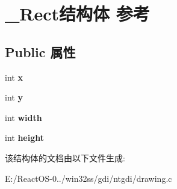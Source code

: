 \hypertarget{struct___rect}{}\section{\+\_\+\+Rect结构体 参考}
\label{struct___rect}
\subsection*{Public 属性}
\begin{DoxyCompactItemize}
\item 
\mbox{\label{struct___rect_a87b50e69003b06f4d65c2d33a440e279}} 
int {\bfseries x}
\item 
\mbox{\label{struct___rect_a035d836f0608347f8926838cba583d26}} 
int {\bfseries y}
\item 
\mbox{\label{struct___rect_a97f79187fb9ecb1f771c4be44830e8a3}} 
int {\bfseries width}
\item 
\mbox{\label{struct___rect_a481278443ed2918c0acd9484a7f2a5c7}} 
int {\bfseries height}
\end{DoxyCompactItemize}


该结构体的文档由以下文件生成\+:\begin{DoxyCompactItemize}
\item 
E\+:/\+React\+O\+S-\/0../win32ss/gdi/ntgdi/drawing.\+c\end{DoxyCompactItemize}
